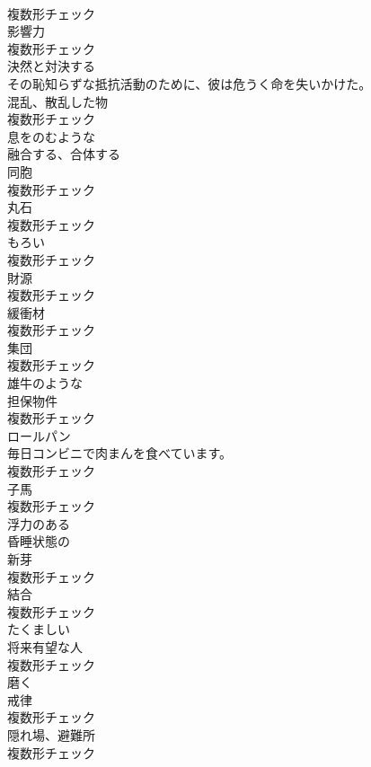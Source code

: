 \documentclass[8pt]{extreport}
\begin{document}
\begin{CJK}{UTF8}{min}
\\	複数形チェック
\\	[名詞]	影響力	
\\	複数形チェック
\\	[動詞]	決然と対決する	
\\	その恥知らずな抵抗活動のために、彼は危うく命を失いかけた。	
\\	[名詞]	混乱、散乱した物	
\\	複数形チェック
\\	[形容詞]	息をのむような	
\\	[動詞]	融合する、合体する	
\\	[名詞]	同胞	
\\	複数形チェック
\\	[名詞]	丸石	
\\	複数形チェック
\\	[名詞]	もろい	
\\	複数形チェック
\\	[名詞]	財源	
\\	複数形チェック
\\	[名詞]	緩衝材	
\\	複数形チェック
\\	[名詞]	集団	
\\	複数形チェック
\\	[形容詞]	雄牛のような	
\\	[名詞]	担保物件	
\\	複数形チェック
\\	[名詞]	ロールパン	
\\	毎日コンビニで肉まんを食べています。	
\\	複数形チェック
\\	[名詞]	子馬	
\\	複数形チェック
\\	[形容詞]	浮力のある	
\\	[形容詞]	昏睡状態の	
\\	[名詞]	新芽	
\\	複数形チェック
\\	[名詞]	結合	
\\	複数形チェック
\\	[形容詞]	たくましい	
\\	[名詞]	将来有望な人	
\\	複数形チェック
\\	[動詞]	磨く	
\\	[名詞]	戒律	
\\	複数形チェック
\\	[名詞]	隠れ場、避難所	
\\	複数形チェック

\end{CJK}
\end{document}
